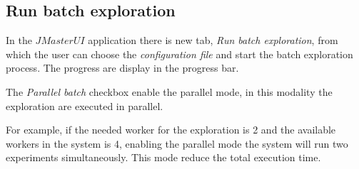 \documentclass{article}
\begin{document}
\subsection{Run batch exploration}
In the $JMasterUI$ application there is new tab, \textit{Run batch exploration}, from which the user can choose the \textit{configuration file}
and start the batch exploration process. The progress are display in the progress bar.

The \textit{Parallel batch} checkbox enable the parallel mode, in this modality the exploration are executed in parallel. 

For example, if the needed worker for the exploration is 2 and the available workers in the system is 4, enabling the parallel mode the system 
will run two experiments simultaneously. This mode reduce the total execution time.
\end{document}
